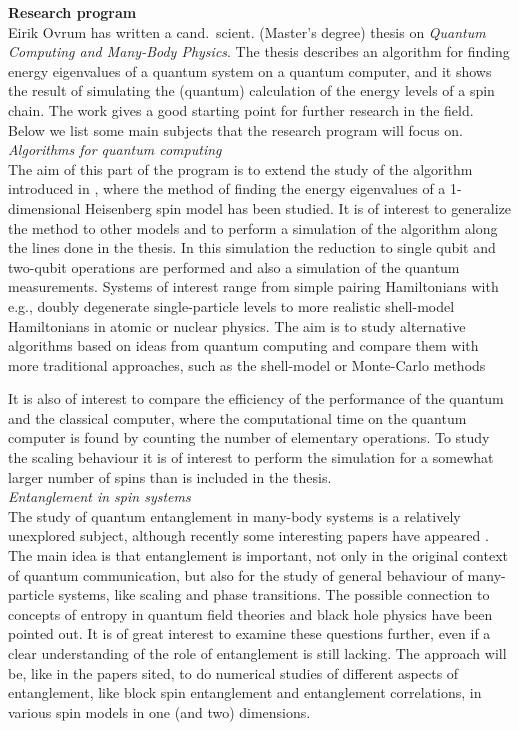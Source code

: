 \noindent
{\large{\bf Research program}}\\
Eirik Ovrum has written a cand.~scient. (Master's degree) 
thesis on {\em Quantum Computing and
Many-Body  Physics}. The thesis describes an algorithm for finding energy
eigenvalues of a quantum system on a quantum computer, and it shows
the result of
simulating the (quantum) calculation of the energy levels of a spin chain. The
work gives a good starting point for further research in the field.  Below we
list some main subjects that the research program will focus on.\\

\noindent
{\em Algorithms for quantum computing}\\
The aim of this part of the program is to extend the study of the algorithm
introduced in  \cite{eirik}, where the method of finding the energy
eigenvalues of a
1-dimensional Heisenberg spin model has been studied. It is of interest to
generalize the method to other models and to perform a simulation of the
algorithm along the lines done in the thesis. In this simulation the
reduction to
single qubit and two-qubit operations are performed and also a
simulation of the
quantum measurements. 
Systems of interest range from simple pairing Hamiltonians with
e.g., doubly degenerate single-particle levels to more realistic shell-model
Hamiltonians in atomic or nuclear physics. The aim is to study alternative
algorithms based on ideas from quantum computing and compare them with
more traditional approaches, such as the shell-model or Monte-Carlo
methods

It is also of interest to compare the efficiency of the
performance of the quantum and the classical computer, where the computational
time on the quantum computer is found by counting the number of elementary
operations. To study the scaling behaviour it is of interest to perform the
simulation for a somewhat larger number of spins than is included in
the thesis.\\

\noindent
{\em Entanglement in spin systems}\\
The study of quantum entanglement in many-body systems is a
relatively unexplored
subject, although recently some interesting papers have appeared
\cite{Osborne, Vidal, Latorre}. The main idea is that entanglement is
important,
not only in the original context of quantum communication, but also
for the study
of general behaviour of many-particle systems, like scaling and phase
transitions.
The possible connection to concepts of entropy in quantum field
theories and black
hole physics have been pointed out. It is of great interest to examine these
questions further, even if a clear understanding of the role of entanglement is
still lacking. The approach will be, like in the papers sited, to do numerical
studies of different aspects of entanglement, like block spin entanglement and
entanglement correlations, in various spin models in one (and two)
dimensions.\\

